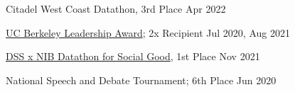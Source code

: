 Citadel West Coast Datathon, 3rd Place \hfill Apr 2022\par
\href{https://alumni.berkeley.edu/community/scholarships/leadership-award}{UC Berkeley Leadership Award}; 2x Recipient \hfill Jul 2020, Aug 2021 \par
\href{https://www.facebook.com/events/933047190947185?}{DSS x NIB Datathon for Social Good}, 1st Place \hfill Nov 2021\par
National Speech and Debate Tournament; 6th Place \hfill Jun 2020 \par